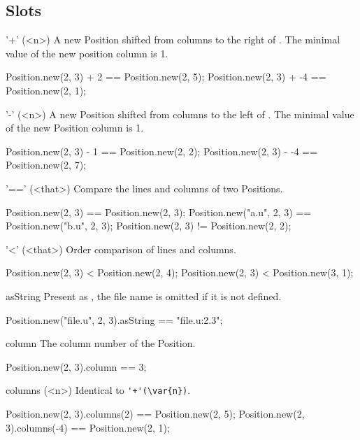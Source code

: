 \subsection{Slots}

\begin{urbiscriptapi}
\item['+'](<n>)%
  A new Position shifted from  columns to the right of \this.  The
  minimal value of the new position column is 1.
\begin{urbiassert}
Position.new(2, 3) + 2  == Position.new(2, 5);
Position.new(2, 3) + -4 == Position.new(2, 1);
\end{urbiassert}

\item['-'](<n>)%
  A new Position shifted from  columns to the left of \this.  The
  minimal value of the new Position column is 1.
\begin{urbiassert}
Position.new(2, 3) - 1  == Position.new(2, 2);
Position.new(2, 3) - -4 == Position.new(2, 7);
\end{urbiassert}

\item['=='](<that>)%
  Compare the lines and columns of two Positions.
\begin{urbiassert}
Position.new(2, 3)        == Position.new(2, 3);
Position.new("a.u", 2, 3) == Position.new("b.u", 2, 3);
Position.new(2, 3)        != Position.new(2, 2);
\end{urbiassert}

\item['<'](<that>)%
  Order comparison of lines and columns.
\begin{urbiassert}
Position.new(2, 3) < Position.new(2, 4);
Position.new(2, 3) < Position.new(3, 1);
\end{urbiassert}

\item[asString]
  Present as , the file name is
  omitted if it is not defined.
\begin{urbiassert}
Position.new("file.u", 2, 3).asString == "file.u:2.3";
\end{urbiassert}

\item[column]
  The column number of the Position.
\begin{urbiassert}
Position.new(2, 3).column == 3;
\end{urbiassert}

\item[columns](<n>)%
  Identical to \lstinline|'+'(\var{n})|.
\begin{urbiassert}
Position.new(2, 3).columns(2)  == Position.new(2, 5);
Position.new(2, 3).columns(-4) == Position.new(2, 1);
\end{urbiassert}


\end{urbiscriptapi}
